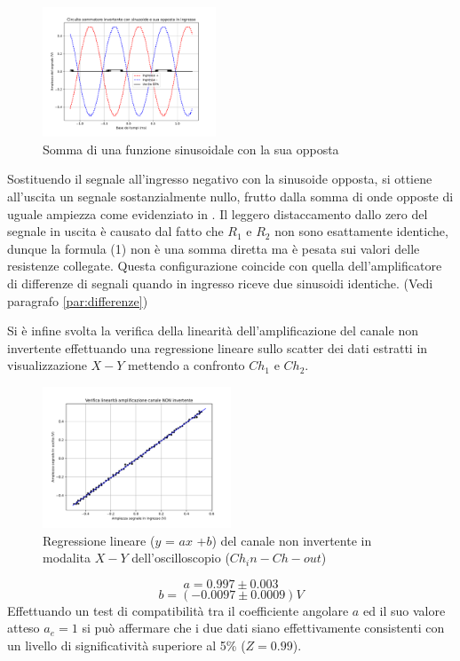 \documentclass[journal]{IEEEtran}
\begin{document}
\begin{figure}[H]%
\begin{center}
\includegraphics[width=0.46\textwidth]{analysis/output/OPA_mixer_sin2.pdf}
\caption{Somma di una funzione sinusoidale con la sua opposta}
\label{fig:Mixer2}
\end{center}
\end{figure}

Sostituendo il segnale all'ingresso negativo con la sinusoide opposta, si ottiene all'uscita un segnale sostanzialmente nullo, frutto dalla somma di onde opposte di uguale ampiezza come evidenziato in . Il leggero distaccamento dallo zero del segnale in uscita è causato dal fatto che $R_1$ e $R_2$ non sono esattamente identiche, dunque la formula (1) non è una somma diretta ma è pesata sui valori delle resistenze collegate. Questa configurazione coincide con quella dell'amplificatore di differenze di segnali quando in ingresso riceve due sinusoidi identiche. (Vedi paragrafo \ref{par:differenze})

 Si è infine svolta la verifica della linearità dell'amplificazione del canale non invertente effettuando una regressione lineare sullo scatter dei dati estratti in visualizzazione $X-Y$ mettendo a confronto $Ch_1$ e $Ch_2$.
\begin{figure}[H]%
\begin{center}
\includegraphics[width=0.50\textwidth]{analysis/output/OPA-linfit-non-inv.pdf}
\caption{Regressione lineare ($y$ = $ax$ +$b$) del canale non invertente in modalita $X-Y$ dell'oscilloscopio ($Ch_in-Ch-out$)}
\label{fig:lin-non-inv}
\end{center}
\end{figure}
\[a = 0.997 \pm 0.003 \]
\[b = (-0.0097 \pm 0.0009) V \]
Effettuando un test di compatibilità tra il coefficiente angolare $a$ ed il suo valore atteso $a_e = 1$ si può affermare che i due dati  siano effettivamente consistenti con un livello di significatività superiore al 5\% ($Z=0.99$).
\end{document}
